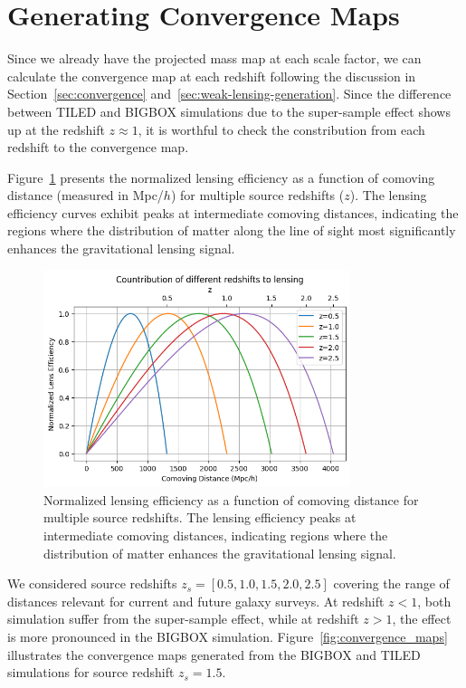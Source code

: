 \section{Generating Convergence Maps}
Since we already have the projected mass map at each scale factor, we can calculate the convergence map at each redshift following the discussion in Section~\ref{sec:convergence} and~\ref{sec:weak-lensing-generation}. Since the difference between TILED and BIGBOX simulations due to the super-sample effect shows up at the redshift $z \approx 1$, it is worthful to check the constribution from each redshift to the convergence map.

Figure~\ref{fig:lensing_efficiency} presents the normalized lensing efficiency as a function of comoving distance (measured in Mpc/$h$) for multiple source redshifts ($z$). The lensing efficiency curves exhibit peaks at intermediate comoving distances, indicating the regions where the distribution of matter along the line of sight most significantly enhances the gravitational lensing signal. 

\begin{figure}
    \centering
    \includegraphics[width=0.8\textwidth]{figures/lensefficiency.png}
    \caption[Normalized lensing efficiency for multiple source redshifts]{Normalized lensing efficiency as a function of comoving distance for multiple source redshifts. The lensing efficiency peaks at intermediate comoving distances, indicating regions where the distribution of matter enhances the gravitational lensing signal.} \label{fig:lensing_efficiency}
\end{figure}

We considered source redshifts $z_s = [0.5, 1.0, 1.5, 2.0, 2.5]$ covering the range of distances relevant for current and future galaxy surveys. At redshift $z < 1$, both simulation suffer from the super-sample effect, while at redshift $z > 1$, the effect is more pronounced in the BIGBOX simulation. Figure~\ref{fig:convergence_maps} illustrates the convergence maps generated from the BIGBOX and TILED simulations for source redshift $z_s = 1.5$. 

